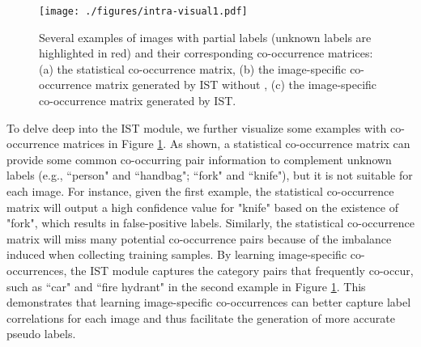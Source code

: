 \begin{figure}[!t]
   \centering
   \texttt{[image: ./figures/intra-visual1.pdf]}
   \caption{Several examples of images with partial labels (unknown labels are highlighted in red) and their corresponding co-occurrence matrices: (a) the statistical co-occurrence matrix, (b) the image-specific co-occurrence matrix generated by IST without , (c) the image-specific co-occurrence matrix generated by IST.}
   \label{fig:vis-ist}
\end{figure}

To delve deep into the IST module, we further visualize some examples with co-occurrence matrices in Figure \ref{fig:vis-ist}. As shown, a statistical co-occurrence matrix can provide some common co-occurring pair information to complement unknown labels (e.g., ``person" and ``handbag"; ``fork" and ``knife"), but it is not suitable for each image. For instance, given the first example, the statistical co-occurrence matrix will output a high confidence value for "knife" based on the existence of "fork", which results in false-positive labels. Similarly, the statistical co-occurrence matrix will miss many potential co-occurrence pairs because of the imbalance induced when collecting training samples. By learning image-specific co-occurrences, the IST module captures the category pairs that frequently co-occur, such as ``car" and ``fire hydrant" in the second example in Figure \ref{fig:vis-ist}. This demonstrates that learning image-specific co-occurrences can better capture label correlations for each image and thus facilitate the generation of more accurate pseudo labels.

